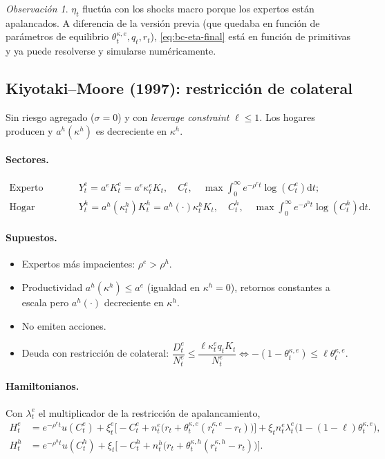 \documentclass[11pt]{article}
\theoremstyle{definition}
\theoremstyle{remark}
\newtheorem*{obs}{Observación}
\newcommand{\dd}{\mathrm{d}}
\newcommand{\aE}{a^{e}}
\newcommand{\aH}{a^{h}}
\newcommand{\re}{\rho^{e}}
\newcommand{\rh}{\rho^{h}}
\newcommand{\thke}{\theta_t^{\kappa,e}}
\newcommand{\thkh}{\theta_t^{\kappa,h}}
\begin{document}
\begin{obs}
$\eta_t$ fluctúa con los shocks macro porque los expertos están apalancados. A diferencia de la versión previa (que quedaba en función de parámetros de equilibrio $\thke,q_t,r_t$), \eqref{eq:bc-eta-final} está en función de primitivas y ya puede resolverse y simularse numéricamente.
\end{obs}

\subsection{Kiyotaki--Moore (1997): restricción de colateral}

Sin riesgo agregado ($\sigma=0$) y con \emph{leverage constraint} $\ell\le1$. Los hogares producen y $\aH(\kappa^{h})$ es decreciente en $\kappa^{h}$.

\paragraph{Sectores.}
\begin{align*}
\text{Experto (Farmers):}\quad & Y_t^{e}=\aE K_t^{e}=\aE\kappa_t^{e}K_t,\quad C_t^{e},\quad \max\int_0^\infty e^{-\re t}\log(C_t^{e})\dd t;\\
\text{Hogar (Gatherers):}\quad & Y_t^{h}=\aH(\kappa_t^{h})K_t^{h}=\aH(\cdot)\kappa_t^{h}K_t,\quad C_t^{h},\quad \max\int_0^\infty e^{-\rh t}\log(C_t^{h})\dd t.
\end{align*}

\paragraph{Supuestos.}
\begin{itemize}[leftmargin=2.2em]
\item Expertos más impacientes: $\re>\rh$.
\item Productividad $\aH(\kappa^{h})\le\aE$ (igualdad en $\kappa^{h}=0$), retornos constantes a escala pero $\aH(\cdot)$ decreciente en $\kappa^{h}$.
\item No emiten acciones.
\item Deuda con restricción de colateral: $\dfrac{D_t^{e}}{N_t^{e}}\le\dfrac{\ell\kappa_t^{e}q_tK_t}{N_t^{e}}\iff-(1-\thke)\le\ell\thke$.
\end{itemize}

\paragraph{Hamiltonianos.} Con $\lambda_t^{e}$ el multiplicador de la restricción de apalancamiento,
\begin{align}
H_t^{e}&=e^{-\re t}u(C_t^{e})+\xi_t^{e}\big[-C_t^{e}+n_t^{e}\big(r_t+\thke(r_t^{\kappa,e}-r_t)\big)\big]+\xi_t n_t^{e}\lambda_t^{e}\big(1-(1-\ell)\thke\big),\\
H_t^{h}&=e^{-\rh t}u(C_t^{h})+\xi_t\big[-C_t^{h}+n_t^{h}\big(r_t+\thkh(r_t^{\kappa,h}-r_t)\big)\big].
\end{align}
\end{document}
